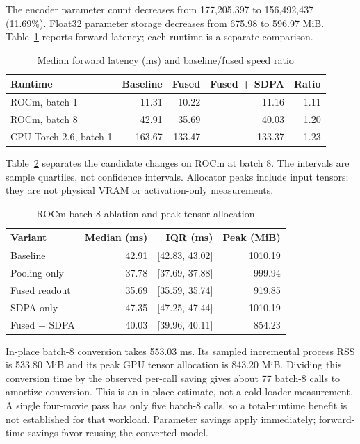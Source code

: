 The encoder parameter count decreases from 177,205,397 to 156,492,437 (11.69\%). Float32 parameter storage decreases from 675.98 to 596.97 MiB. Table~\ref{tab:runtime} reports forward latency; each runtime is a separate comparison.

\begin{table}[htbp]\centering\sffamily\small
\caption{Median forward latency (ms) and baseline/fused speed ratio}\label{tab:runtime}
\begin{tabular}{@{}lrrrr@{}}\toprule
Runtime & Baseline & Fused & Fused + SDPA & Ratio \\\midrule
ROCm, batch 1 & 11.31 & 10.22 & 11.16 & 1.11 \\
ROCm, batch 8 & 42.91 & 35.69 & 40.03 & 1.20 \\
CPU Torch 2.6, batch 1 & 163.67 & 133.47 & 133.37 & 1.23 \\
\bottomrule\end{tabular}\end{table}

Table~\ref{tab:ablation} separates the candidate changes on ROCm at batch 8. The intervals are sample quartiles, not confidence intervals. Allocator peaks include input tensors; they are not physical VRAM or activation-only measurements.

\begin{table}[htbp]\centering\sffamily\small
\caption{ROCm batch-8 ablation and peak tensor allocation}\label{tab:ablation}
\begin{tabular}{@{}lrrr@{}}\toprule
Variant & Median (ms) & IQR (ms) & Peak (MiB) \\\midrule
Baseline & 42.91 & [42.83, 43.02] & 1010.19 \\
Pooling only & 37.78 & [37.69, 37.88] & 999.94 \\
Fused readout & 35.69 & [35.59, 35.74] & 919.85 \\
SDPA only & 47.35 & [47.25, 47.44] & 1010.19 \\
Fused + SDPA & 40.03 & [39.96, 40.11] & 854.23 \\
\bottomrule\end{tabular}\end{table}

In-place batch-8 conversion takes 553.03 ms. Its sampled incremental process RSS is 533.80 MiB and its peak GPU tensor allocation is 843.20 MiB. Dividing this conversion time by the observed per-call saving gives about 77 batch-8 calls to amortize conversion. This is an in-place estimate, not a cold-loader measurement. A single four-movie pass has only five batch-8 calls, so a total-runtime benefit is not established for that workload. Parameter savings apply immediately; forward-time savings favor reusing the converted model.

